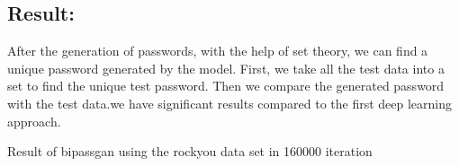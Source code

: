 \documentclass[runningheads]{llncs}
\begin{document}
\subsection{Result:}
\newline
{{After the generation of passwords, with the help of set theory, we can find a unique password generated by the model. First, we take all the test data into a set to find the unique test password. Then we compare the generated password with the test data.we have significant results compared to the first deep learning approach.
\newline

\begin{table}[htb]
\centering
\caption{Result of passgan using the Rockyou data set in 199000 iterations}
\label{}

\end{table}


\par
\begin{table}[htb]
\centering
\caption{Result of bipassgan using the My space data in 160000 iteration}
\label{}
\end{table}

\par
\newline
\begin{table}[htb]
\centering
\caption{Result of bipassgan using the rockyou data set in 160000 iteration}
\label{}
\scalebox{0.8}{

}
\end{table}}}
\end{document}
